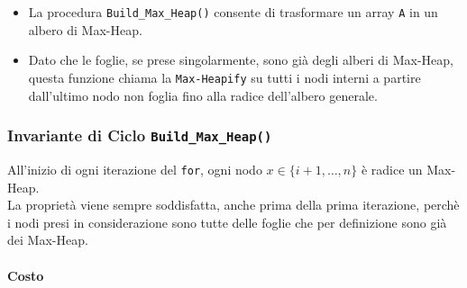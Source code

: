 \documentclass{article}
\begin{document}
\begin{itemize}
    \item La procedura \verb|Build_Max_Heap()| consente di trasformare un array \verb|A| in un albero di Max-Heap.
    \item Dato che le foglie, se prese singolarmente, sono già degli alberi di Max-Heap, questa funzione chiama la \verb|Max-Heapify| su tutti i nodi interni a partire dall'ultimo nodo non foglia fino alla radice dell'albero generale.
\end{itemize}

\cprotect\subsubsection{Invariante di Ciclo \verb|Build_Max_Heap()|}

All'inizio di ogni iterazione del \verb|for|, ogni nodo $x \in \{i + 1, \dots, n\}$ è radice un Max-Heap. \\
La proprietà viene sempre soddisfatta, anche prima della prima iterazione, perchè i nodi presi in considerazione sono tutte delle foglie che per definizione sono già dei Max-Heap.

\paragraph{Costo}
\end{document}
